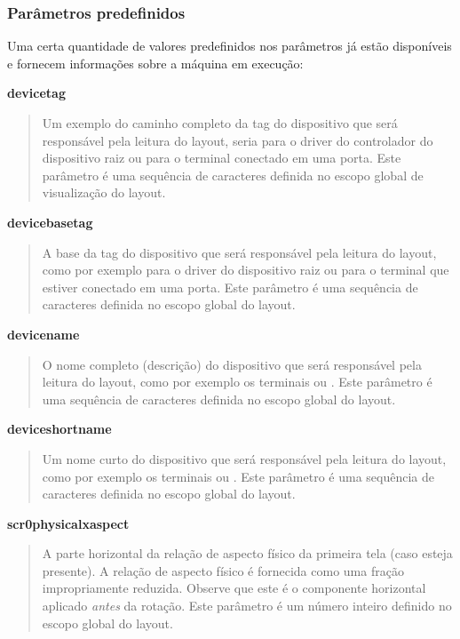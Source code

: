 \documentclass[letterpaper,10pt,brazil]{sphinxmanual}
\begin{document}
\subsubsection{Parâmetros predefinidos}
\label{techspecs/layout_files:layout-concepts-predef-params}\label{techspecs/layout_files:parametros-predefinidos}
Uma certa quantidade de valores predefinidos nos parâmetros já estão
disponíveis e fornecem informações sobre a máquina em execução:

\textbf{devicetag}
\begin{quote}

Um exemplo do caminho completo da tag do dispositivo que será
responsável pela leitura do layout, seria \sphinxcode{:} para o driver do
controlador do dispositivo raiz ou  para o terminal
conectado em uma porta. Este parâmetro é uma sequência de caracteres
definida no escopo global de visualização do layout.
\end{quote}

\textbf{devicebasetag}
\begin{quote}

A base da tag do dispositivo que será responsável pela leitura do
layout, como por exemplo  para o driver do dispositivo raiz
ou  para o terminal que estiver conectado em uma porta.
Este parâmetro é uma sequência de caracteres definida no escopo
global do layout.
\end{quote}

\textbf{devicename}
\begin{quote}

O nome completo (descrição) do dispositivo que será responsável pela
leitura do layout, como por exemplo os terminais  ou
. Este parâmetro é uma sequência de caracteres
definida no escopo global do layout.
\end{quote}

\textbf{deviceshortname}
\begin{quote}

Um nome curto do dispositivo que será responsável pela leitura do
layout, como por exemplo os terminais  ou .
Este parâmetro é uma sequência de caracteres definida no escopo
global do layout.
\end{quote}

\textbf{scr0physicalxaspect}
\begin{quote}

A parte horizontal da relação de aspecto físico da primeira tela
(caso esteja presente). A relação de aspecto físico é fornecida como
uma fração impropriamente reduzida. Observe que este é o componente
horizontal aplicado \emph{antes} da rotação. Este parâmetro é um número
inteiro definido no escopo global do layout.
\end{quote}
\end{document}

